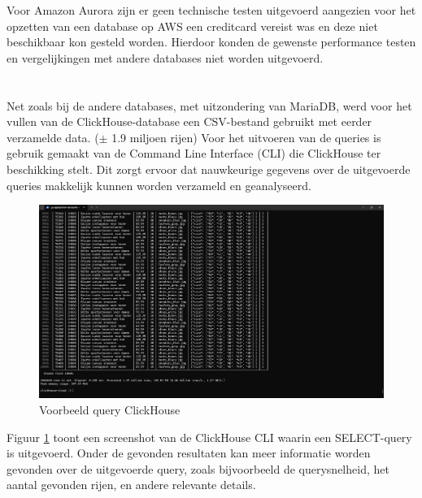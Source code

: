 Voor Amazon Aurora zijn er geen technische testen uitgevoerd aangezien voor het opzetten van een database op AWS een creditcard vereist was en deze niet beschikbaar kon gesteld worden. Hierdoor konden de gewenste performance testen en vergelijkingen met andere databases niet worden uitgevoerd.



\section{}%
\label{sec:clickhouse}

\subsection{}%
\label{subsec:creating-clickhouse}

Net zoals bij de andere databases, met uitzondering van MariaDB, werd voor het vullen van de ClickHouse-database een CSV-bestand gebruikt met eerder verzamelde data. ($\pm$ 1.9 miljoen rijen) Voor het uitvoeren van de queries is gebruik gemaakt van de Command Line Interface (CLI) die ClickHouse ter beschikking stelt. Dit zorgt ervoor dat nauwkeurige gegevens over de uitgevoerde queries makkelijk kunnen worden verzameld en geanalyseerd.

\begin{figure}[H]
    \centering
    \includegraphics[width=\linewidth]{"graphics/ClickHouse Query"}
    \caption[Voorbeeld query ClickHouse]{Voorbeeld query ClickHouse}
    \label{fig:clickhouse-query}
\end{figure}

Figuur \ref{fig:clickhouse-query} toont een screenshot van de ClickHouse CLI waarin een SELECT-query is uitgevoerd. Onder de gevonden resultaten kan meer informatie worden gevonden over de uitgevoerde query, zoals bijvoorbeeld de querysnelheid, het aantal gevonden rijen, en andere relevante details.


